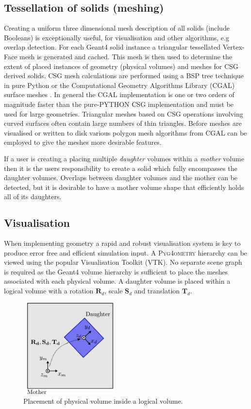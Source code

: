 \documentclass[final,5p,times,twocolumn]{elsarticle}
\newcommand{\PYGEOMETRY}{\textsc{Pyg4ometry}}
\begin{document}
\subsection{Tessellation of solids (meshing)}
Creating a uniform three dimensional mesh description of all solids (include Booleans) is exceptionally useful, for visualisation and other algorithms, e.g overlap 
detection. For each Geant4 solid instance a triangular tessellated Vertex-Face mesh is generated and cached. This mesh is then used to determine the extent 
of placed instances of geometry (physical volumes) and meshes for CSG derived solids. CSG mesh calculations are performed using a BSP tree technique in 
pure Python \cite{pycsg} or the Computational Geometry Algorithms Library (CGAL) surface meshes \cite{cgal:bsmf-sm-20b}. In general the CGAL implementation is one or two orders of magnitude faster than the pure-PYTHON CSG implementation and must be used for large geometries. Triangular meshes based on CSG 
operations involving curved surfaces often contain large numbers of thin triangles. Before meshes are visualised or written to disk various polygon mesh 
algorithms  from CGAL \cite{cgal:lty-pmp-20b} can be employed to give the meshes more desirable features. 

If a user is creating a placing multiple {\em daughter} volumes within a {\em mother} volume then it is the users responsibility to create a solid which fully 
encompasses the daughter volumes. Overlaps between daughter volumes and the mother can be detected, but it is desirable to have a mother volume 
shape that efficiently holds all of its daughters. 
 
\subsection{Visualisation} \label{sec:visualisation}
When implementing geometry a rapid and robust visualisation system is key to produce error free and efficient simulation input.
A  \PYGEOMETRY{}  hierarchy can be viewed using the popular Visualisation Toolkit (VTK). No separate scene graph is required as the Geant4 volume hierarchy is sufficient 
to place the meshes associated with each physical volume. A daughter volume is placed within a logical volume with a rotation $\mathbf{R}_d$, scale $\mathbf{S}_d$ and translation $\mathbf{T}_d$.

\begin{figure}[htb!]
\begin{center}
\includegraphics[width=5cm]{./diagrams/lvToPv.pdf}
\caption{Placement of physical volume inside a logical volume.}
\label{fig:lvToPv}
\end{center}
\end{figure} 
\end{document}
